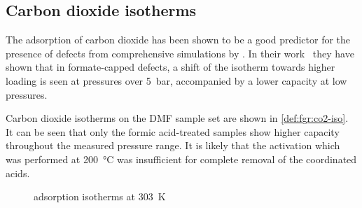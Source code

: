 
\subsection{Carbon dioxide isotherms}\label{def:co2}

The adsorption of carbon dioxide has been shown to be a good 
predictor for the presence of defects from comprehensive simulations
by \citeauthor{thorntonDefectsMetalOrganic2016}.
In their work~\cite{thorntonDefectsMetalOrganic2016} they have shown
that in formate-capped defects, a shift of the  isotherm towards
higher loading is seen at pressures over \SI{5}{\bar}, accompanied 
by a lower capacity at low pressures.

Carbon dioxide isotherms on the DMF sample set are shown in 
\autoref{def:fgr:co2-iso}. It can be seen that only the formic acid-treated
samples show higher capacity throughout the measured pressure range.
It is likely that the activation which was performed at 
\SI{200}{\degreeCelsius} was insufficient for complete removal of
the coordinated acids.

\begin{figure}[htb]
    \centering


    \caption{ adsorption isotherms at \SI{303}{\kelvin}}%
    \label{def:fgr:co2-iso}
\end{figure}
